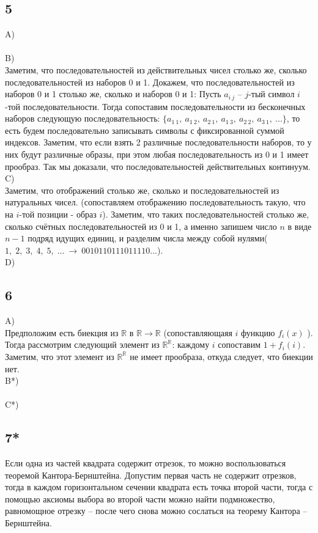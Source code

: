 		\subsection{5}
		A)\\
		\\
		B)\\
		Заметим, что последовательностей из действительных чисел столько же, сколько последовательностей из наборов 0 и 1. Докажем, что последовательностей из наборов 0 и 1 столько же, сколько и наборов 0 и 1: Пусть $a_{i \ j}$ --  $j$-тый символ $i$-той последовательности. Тогда сопоставим последовательности из бесконечных наборов следующую последовательность: $\{ a_{1 \ 1},\: a_{1 \ 2},\: a_{2 \ 1},\: a_{1 \ 3},\: a_{2 \ 2},\: a_{3 \ 1},\: ... \}$, то есть будем последовательно записывать символы с фиксированной суммой индексов. Заметим, что если взять 2 различные последовательности наборов, то у них будут различные образы, при этом любая последовательность из 0 и 1 имеет прообраз. Так мы доказали, что последовательностей действительных континуум.
		\\
		C)\\
		Заметим, что отображений столько же, сколько и последовательностей из натуральных чисел. (сопоставляем отображению последовательность такую, что на $i$-той позиции - образ $i$).
		Заметим, что таких последовательностей столько же, сколько счётных последовательностей из 0 и 1, а именно запишем число $n$ в виде $n - 1$ подряд идущих единиц, и разделим числа между собой нулями($1,\; 2,\; 3,\; 4,\; 5,\; ... \: \to \: 0010110111011110...$). 
		\\
		D)\\
		\subsection{6}
		A)\\
		Предположим есть биекция из $\mathbb{R}$ в $\mathbb{R} \to \mathbb{R}$ (сопоставляющаяя $i$ функцию $f_i(x)$ ). Тогда рассмотрим следующий элемент из $\mathbb{R}^{\mathbb{R}}$: каждому $i$ сопоставим $1 + f_i(i)$. Заметим, что этот элемент из $\mathbb{R}^{\mathbb{R}}$ не имеет прообраза, откуда следует, что биекции нет. 
		\\
		B*)\\
		\\
		C*)\\
		
		\subsection{7*}
		Если одна из частей квадрата содержит отрезок, то можно воспользоваться теоремой Кантора-Бернштейна.
		Допустим первая часть не содержит отрезков, тогда в каждом горизонтальном сечении квадрата есть точка второй части, тогда с помощью аксиомы выбора во второй части можно найти подмножество, равномощное
		отрезку -- после чего снова можно сослаться на теорему Кантора -- Бернштейна.
		
